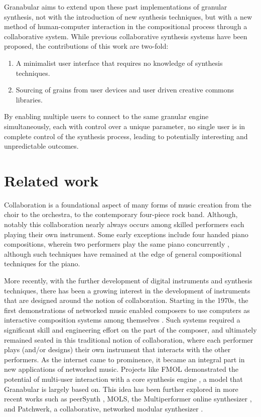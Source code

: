 \documentclass{nime-alternate}
\begin{document}
Granabular aims to extend upon these past implementations of granular synthesis, not with the introduction of new synthesis techniques, 
but with a new method of human-computer interaction in the compositional process through a collaborative system. 
While previous collaborative synthesis systems have been proposed, the contributions of this work are two-fold:

\begin{enumerate}
	\item A minimalist user interface that requires no knowledge of synthesis techniques.
	\item Sourcing of grains from user devices and user driven creative commons libraries. 
\end{enumerate}

By enabling multiple users to connect to the same granular engine simultaneously, 
each with control over a unique parameter, no single user is in complete control of the synthesis process, 
leading to potentially interesting and unpredictable outcomes. 

\section{Related work}

Collaboration is a foundational aspect of many forms of music creation from the choir to the orchestra, 
to the contemporary four-piece rock band. 
Although, notably this collaboration nearly always occurs among skilled performers each playing their own instrument. 
Some early exceptions include four handed piano compositions, 
wherein two performers play the same piano concurrently \cite{kuhn2001music}, 
although such techniques have remained at the edge of general compositional techniques for the piano. 

More recently, with the further development of digital instruments and synthesis techniques, 
there has been a growing interest in the development of instruments that are designed around the notion of collaboration. 
Starting in the 1970s, the first demonstrations of networked music enabled composers to use computers as interactive composition systems among themselves \cite{bischoff1978network}. 
Such systems required a significant skill and engineering effort on the part of the composer, 
and ultimately remained seated in this traditional notion of collaboration, 
where each performer plays (and/or designs) their own instrument that interacts with the other performers. 
As the internet came to prominence, it became an integral part in new applications of networked music. 
Projects like FMOL demonstrated the potential of multi-user interaction with a core synthesis engine \cite{jorda2001fmol}, 
a model that Granabular is largely based on. 
This idea has been further explored in more recent works such as peerSynth \cite{stelkens2003peersynth}, 
MOLS, the Multiperformer online synthesizer \cite{herrera2009mols}, 
and Patchwerk, a collaborative, networked modular synthesizer \cite{mayton2012patchwerk}.
\end{document}
